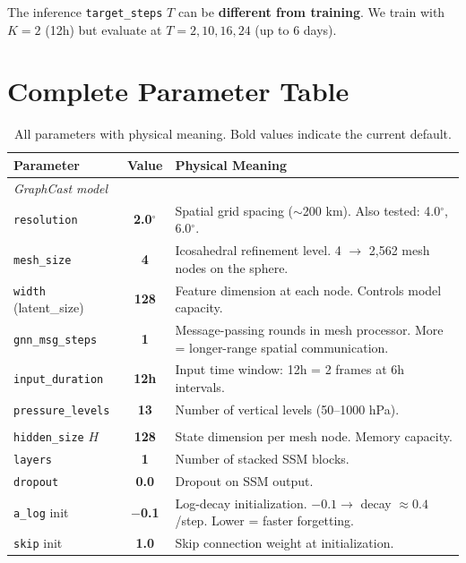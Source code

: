 \documentclass[11pt,a4paper]{article}
\begin{document}
The inference \texttt{target\_steps} $T$ can be \textbf{different from training}. We train with $K{=}2$ (12h) but evaluate at $T{=}2, 10, 16, 24$ (up to 6 days).

\section{Complete Parameter Table}

\begin{table}[H]
\centering
\caption{All parameters with physical meaning. Bold values indicate the current default.}
\small
\begin{tabular}{p{3.8cm}cp{6.5cm}}
\toprule
Parameter & Value & Physical Meaning \\
\midrule
\multicolumn{3}{l}{\textit{GraphCast model}} \\
\texttt{resolution} & \textbf{2.0}$^\circ$ & Spatial grid spacing ($\sim$200 km). Also tested: 4.0$^\circ$, 6.0$^\circ$. \\
\texttt{mesh\_size} & \textbf{4} & Icosahedral refinement level. 4 $\to$ 2,562 mesh nodes on the sphere. \\
\texttt{width} (latent\_size) & \textbf{128} & Feature dimension at each node. Controls model capacity. \\
\texttt{gnn\_msg\_steps} & \textbf{1} & Message-passing rounds in mesh processor. More = longer-range spatial communication. \\
\texttt{input\_duration} & \textbf{12h} & Input time window: 12h = 2 frames at 6h intervals. \\
\texttt{pressure\_levels} & \textbf{13} & Number of vertical levels (50--1000 hPa). \\
\addlinespace
\multicolumn{3}{l}{\textit{Mamba SSM}} \\
\texttt{hidden\_size} $H$ & \textbf{128} & State dimension per mesh node. Memory capacity. \\
\texttt{layers} & \textbf{1} & Number of stacked SSM blocks. \\
\texttt{dropout} & \textbf{0.0} & Dropout on SSM output. \\
\texttt{a\_log} init & \textbf{$-$0.1} & Log-decay initialization. $-0.1 \to$ decay $\approx 0.4$/step. Lower = faster forgetting. \\
\texttt{skip} init & \textbf{1.0} & Skip connection weight at initialization. \\

\end{tabular}
\end{table}
\end{document}
